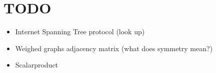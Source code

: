 \section{TODO}\par
\begin{itemize}
  \item Internet Spanning Tree protocol (look up) 
  \item Weighed graphs adjacency matrix (what does symmetry mean?)
  \item Scalarproduct
\end{itemize}
